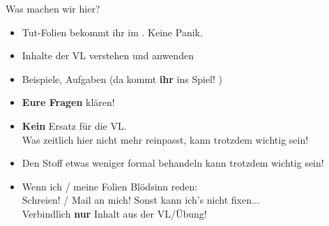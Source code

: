 \begin{frame}[t]{Was machen wir hier?}
	\begin{itemize}[<+->]
		\item Tut-Folien bekommt ihr im \ILIAS. Keine Panik.
		\item Inhalte der VL verstehen und anwenden
		\item Beispiele, Aufgaben (da kommt \textbf{ihr} ins Spiel! \smiley)
		\item \textbf{Eure Fragen} klären! 
		\item \textbf{Kein} Ersatz für die VL. \\
			  Was zeitlich hier nicht mehr reinpasst, kann trotzdem wichtig sein!
	    \item Den Stoff etwas weniger formal behandeln \impl {} kann trotzdem wichtig sein! 
	    \item Wenn ich / meine Folien Blödsinn reden: \\
		      Schreien! / Mail an mich! \impl Sonst kann ich's nicht fixen... \frownie \\
		      Verbindlich \textbf{nur} Inhalt aus der VL/Übung! 
	\end{itemize}
\end{frame}

